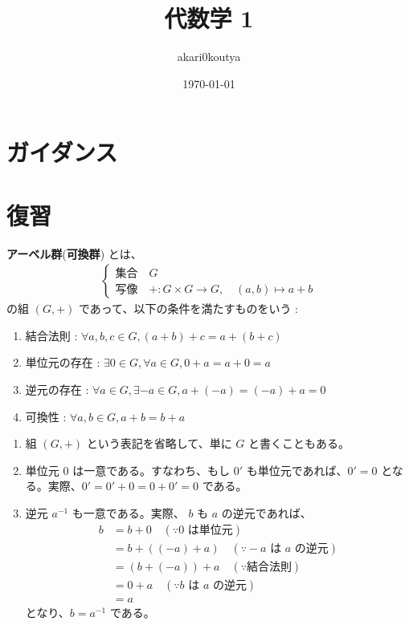 \documentclass[article,paper=a4paper]{jlreq}
\title{代数学 1}
\author{akari0koutya}
\date{\today}
\begin{document}
\maketitle
\tableofcontents
\section{ガイダンス}
\section{復習}
\begin{dfn}
\textbf{アーベル群}(\textbf{可換群}) とは、
\begin{align*}
  \begin{cases}
    \text{集合} \quad G \\
    \text{写像} \quad + \colon G \times G \to G, \quad (a, b) \mapsto a + b 
  \end{cases}
\end{align*}
の組 $(G, +)$ であって、以下の条件を満たすものをいう :
\begin{enumerate}
  \item 結合法則 : $\forall a, b, c \in G, (a + b) + c = a + (b + c)$
  \item 単位元の存在 : $\exists 0 \in G, \forall a \in G, 0 + a = a + 0 = a$
  \item 逆元の存在 : $\forall a \in G, \exists -a \in G, a + (-a) = (-a) + a = 0$
  \item 可換性 : $\forall a, b \in G, a + b = b + a$
\end{enumerate}
\end{dfn}

\begin{rem}
\begin{enumerate}
  \item 組 $(G, +)$ という表記を省略して、単に $G$ と書くこともある。
  \item 単位元 $0$ は一意である。すなわち、もし $0'$ も単位元であれば、$0' = 0$ となる。実際、$0' = 0' + 0 = 0 + 0' = 0$ である。
  \item 逆元 $a^{-1}$ も一意である。実際、 $b$ も $a$ の逆元であれば、
\begin{align*}
  b &= b + 0 \quad (\because 0 \text{ は単位元})\\
    &= b + ((-a) + a) \quad (\because -a \text{ は } a \text{ の逆元})\\
    &= (b + (-a)) + a \quad (\because \text{結合法則})\\
    &= 0 + a \quad (\because b \text{ は } a \text{ の逆元})\\
    &= a
\end{align*}
となり、$b = a^{-1}$ である。
\end{enumerate}
\end{rem}
\end{document}
